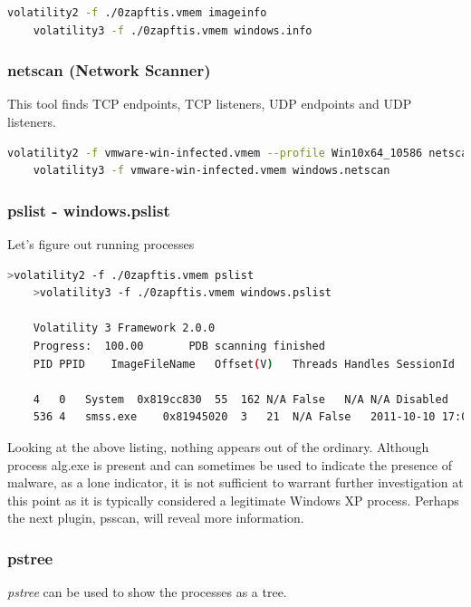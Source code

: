 \begin{lstlisting}[language=bash]
    volatility2 -f ./0zapftis.vmem imageinfo
    volatility3 -f ./0zapftis.vmem windows.info
\end{lstlisting}

\subsubsection{netscan (Network Scanner)}
This tool finds TCP endpoints, TCP listeners, UDP endpoints and UDP listeners.

\begin{lstlisting}[language=bash]
    volatility2 -f vmware-win-infected.vmem --profile Win10x64_10586 netscan
    volatility3 -f vmware-win-infected.vmem windows.netscan
\end{lstlisting}

\subsubsection{pslist - windows.pslist}
Let's figure out running processes

\begin{lstlisting}[language=bash]
    >volatility2 -f ./0zapftis.vmem pslist
    >volatility3 -f ./0zapftis.vmem windows.pslist

    Volatility 3 Framework 2.0.0
    Progress:  100.00		PDB scanning finished
    PID	PPID	ImageFileName	Offset(V)	Threads	Handles	SessionId	Wow64	CreateTime	ExitTime	File output

    4	0	System	0x819cc830	55	162	N/A	False	N/A	N/A	Disabled
    536	4	smss.exe	0x81945020	3	21	N/A	False	2011-10-10 17:03:56.000000 	N/A	Disabled
\end{lstlisting}

Looking at the above listing, nothing appears out of the ordinary. Although process alg.exe is present and can sometimes be used to indicate the presence of malware, as a lone indicator, it is not sufficient to warrant further investigation at this point as it is typically considered a legitimate Windows XP process. Perhaps the next plugin, psscan, will reveal more information.

\columnbreak

\subsubsection{pstree}
\textit{pstree} can be used to show the processes as a tree.

